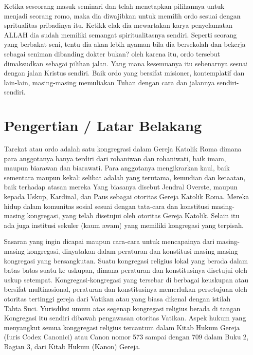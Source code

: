 
Ketika seseorang masuk seminari dan telah menetapkan pilihannya untuk menjadi seorang romo, maka dia diwajibkan untuk memilih ordo sesuai dengan spritualitas pribadinya itu. Ketikk elak dia mewartakan karya penyelamatan ALLAH dia sudah memiliki semangat spiritualitasnya sendiri. Seperti seorang yang berbakat seni, tentu dia akan lebih nyaman bila dia bersekolah dan bekerja sebagai seniman dibanding dokter bukan? oleh karena itu, ordo tersebut dimaksudkan sebagai pilihan jalan. Yang mana kesemuanya itu sebenarnya sesuai dengan jalan Kristus sendiri. Baik ordo yang bersifat misioner, kontemplatif dan lain-lain, masing-masing memuliakan Tuhan dengan cara dan jalannya sendiri-sendiri.

\section*{Pengertian / Latar Belakang}

Tarekat atau ordo adalah satu kongregrasi dalam Gereja Katolik Roma dimana para anggotanya hanya terdiri dari rohaniwan dan rohaniwati, baik imam, maupun biarawan dan biarawati. Para anggotanya mengikrarkan kaul, baik sementara maupun kekal: selibat adalah yang terutama, kemudian dan ketaatan, baik terhadap atasan mereka Yang biasanya disebut Jendral Overste, maupun kepada Uskup, Kardinal, dan Paus sebagai otoritas Gereja Katolik Roma. Mereka hidup dalam komunitas sosial sesuai dengan tata-cara dan konstitusi masing-masing kongregasi, yang telah disetujui oleh otoritas Gereja Katolik. Selain itu ada juga institusi sekuler (kaum awam) yang memiliki kongregasi yang terpisah.

Sasaran yang ingin dicapai maupun cara-cara untuk mencapainya dari masing-masing kongregasi, dinyatakan dalam peraturan dan konstitusi masing-masing kongregasi yang bersangkutan. Suatu kongregasi religius lokal yang berada dalam batas-batas suatu ke uskupan, dimana peraturan dan konstitusinya disetujui oleh uskup setempat. Kongregasi-kongregasi yang tersebar di berbagai keuskupan atau bersifat multinasional, peraturan dan konstitusinya memerlukan persetujuan oleh otoritas tertinggi gereja dari Vatikan atau yang biasa dikenal dengan istilah Tahta Suci. Yurisdiksi umum atas segenap kongregasi religius berada di tangan Kongregasi itu sendiri dibawah pengawasan otoritas Vatikan. Aspek hukum yang menyangkut semua konggregasi religius tercantum dalam Kitab Hukum Gereja (Iuris Codex Canonici) atau Canon nomor 573 sampai dengan 709 dalam Buku 2, Bagian 3, dari Kitab Hukum (Kanon) Gereja.

